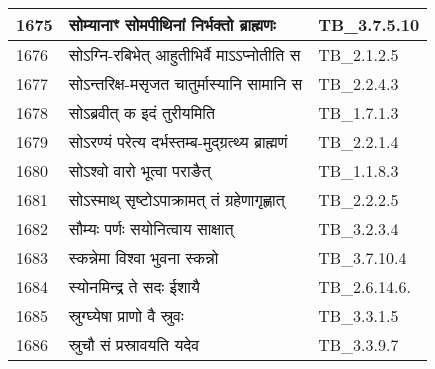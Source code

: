 \documentclass[17pt]{extarticle}
\begin{document}
\begin{longtable}{||p{0.4in}||p{4.9in}||p{0.9in}||}
    \hline
        
    1675 & सोम्यानाꣳ सोमपीथिनां निर्भक्तो ब्राह्मणः & TB\_3.7.5.10       \\
    
    \hline
        
    1676 & सोऽग्नि{-}रबिभेत् आहुतीभिर्वै माऽऽप्नोतीति स & TB\_2.1.2.5       \\
    
    \hline
        
    1677 & सोऽन्तरिक्ष{-}मसृजत चातुर्मास्यानि सामानि स & TB\_2.2.4.3       \\
    
    \hline
        
    1678 & सोऽब्रवीत् क इदं तुरीयमिति & TB\_1.7.1.3       \\
    
    \hline
        
    1679 & सोऽरण्यं परेत्य दर्भस्तम्ब{-}मुद्ग्रत्थ्य ब्राह्मणं & TB\_2.2.1.4       \\
    
    \hline
        
    1680 & सोऽश्वो वारो भूत्वा पराङैत् & TB\_1.1.8.3       \\
    
    \hline
        
    1681 & सोऽस्माथ् सृष्टोऽपाक्रामत् तं ग्रहेणागृह्णात् & TB\_2.2.2.5       \\
    
    \hline
        
    1682 & सौम्यः पर्णः सयोनित्वाय साक्षात् & TB\_3.2.3.4       \\
    
    \hline
        
    1683 & स्कन्नेमा विश्वा भुवना स्कन्नो & TB\_3.7.10.4       \\
    
    \hline
        
    1684 & स्योनमिन्द्र ते सदः ईशायै & TB\_2.6.14.6.       \\
    
    \hline
        
    1685 & स्रुग्घ्येषा प्राणो वै स्रुवः & TB\_3.3.1.5       \\
    
    \hline
        
    1686 & स्रुचौ सं प्रस्रावयति यदेव & TB\_3.3.9.7       \\
    
    \hline
        

\end{longtable}
\end{document}
